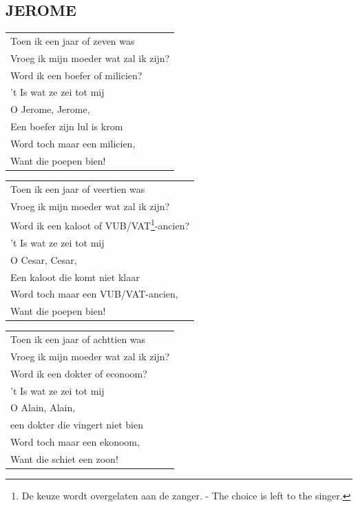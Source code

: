 \documentclass{article}
\begin{document}
\subsection*{JEROME}
\begin{flushleft}
\begin{tabularx}{0.8\textwidth} {
   >{\raggedright\arraybackslash}X}
   Toen ik een jaar of zeven was\\
Vroeg ik mijn moeder wat zal ik zijn?\\
Word ik een boefer of milicien?\\
’t Is wat ze zei tot mij\\
O Jerome, Jerome,\\
Een boefer zijn lul is krom\\
Word toch maar een milicien,\\
Want die poepen bien!\\
\end{tabularx}
\end{flushleft}\begin{flushleft}
\begin{tabularx}{0.8\textwidth} {
   >{\raggedright\arraybackslash}X}
Toen ik een jaar of veertien was\\
Vroeg ik mijn moeder wat zal ik zijn?\\
Word ik een kaloot of VUB/VAT\footnote{De keuze wordt overgelaten aan de zanger. - The choice is left to the singer.}-ancien?\\
’t Is wat ze zei tot mij\\
O Cesar, Cesar,\\
Een kaloot die komt niet klaar\\
Word toch maar een VUB/VAT\footnotemark[2]-ancien,\\
Want die poepen bien!\\
\end{tabularx}
\end{flushleft}\begin{flushleft}
\begin{tabularx}{0.8\textwidth} {
   >{\raggedright\arraybackslash}X}
Toen ik een jaar of achttien was\\
Vroeg ik mijn moeder wat zal ik zijn?\\
Word ik een dokter of econoom?\\
’t Is wat ze zei tot mij\\
O Alain, Alain,\\
een dokter die vingert niet bien\\
Word toch maar een ekonoom,\\
Want die schiet een zoon!\\
\end{tabularx}
\end{flushleft}
\end{document}

